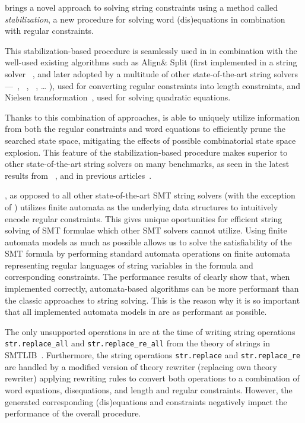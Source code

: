 \noodler brings a novel approach to solving string constraints using a method called \emph{stabilization}, a new procedure for solving word (dis)equations in combination with regular constraints.

This stabilization-based procedure is seamlessly used in \noodler in combination with the well-used existing algorithms such as
Align\& Split (first implemented in a string solver \norn~\cite{Norn,AutomataSplitting}, and later adopted by a multitude of other state-of-the-art string solvers---\ostrich~\cite{AnthonyTowards2016,AnthonyReplaceAll2018,AnthonyComplex2019,AnthonyRegex2022,AnthonyInteger2020},
\ziiistriiire~\cite{Z3str3RE,BerzishDGKMMN23}, \sloth~\cite{holik_string_2018}, \ldots
), used for converting regular constraints into length constraints, and
Nielsen transformation~\cite{nielsen1917}, used for solving quadratic equations.

Thanks to this combination of approaches, \noodler is able to uniquely utilize information from both the regular constraints and word equations to efficiently prune the searched state space, mitigating the effects of possible combinatorial state space explosion.
This feature of the stabilization-based procedure makes \noodler superior to other state-of-the-art string solvers on many benchmarks, as seen in the latest results from \noodler~\cite{tacas24_noodler_10.1007/978-3-031-57246-3_2}, and in previous articles~\cite{fm23_equations_synergy_regular_constraints_DBLP:conf/fm/BlahoudekCCHHLS23, oopsla23_stabilization_DBLP:journals/pacmpl/ChenCHHLS23}.

\noodler, as opposed to all other state-of-the-art SMT string solvers (with the exception of \ostrich) utilizes finite automata as the underlying data structures to intuitively encode regular constraints.
This gives \noodler unique oportunities for efficient string solving of SMT formulae which other SMT solvers cannot utilize.
Using finite automata models as much as possible allows us to solve the satisfiability of the SMT formula by performing standard automata operations on finite automata representing regular languages of string variables in the formula and corresponding constraints.
The performance results of \noodler clearly show that, when implemented correctly, automata-based algorithms can be more performant than the classic approaches to string solving.
This is the reason why it is so important that all implemented automata models in \mata are as performant as possible.

The only unsupported operations in \noodler are at the time of writing string operations \texttt{str.replace\_all} and \texttt{str.replace\_re\_all} from the theory of strings in SMTLIB~\cite{smtlib_theory_strings}.
Furthermore, the string operations \texttt{str.replace} and \texttt{str.replace\_re} are handled by a modified \noodler version of theory rewriter (replacing \ziii own theory rewriter) applying rewriting rules to convert both operations to a combination of word equations, disequations, and length and regular constraints.
However, the generated corresponding (dis)equations and constraints negatively impact the performance of the overall procedure.

